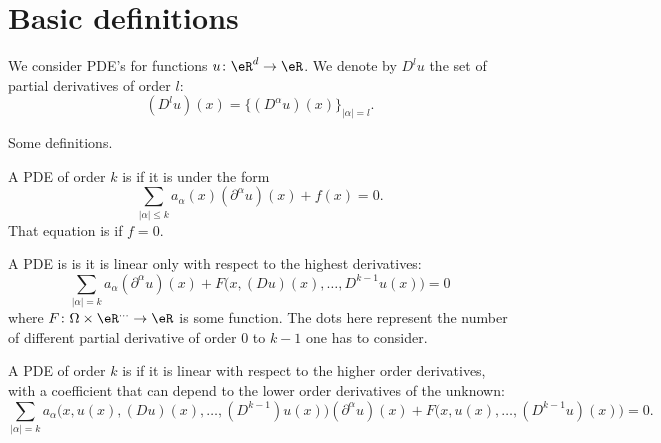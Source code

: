 
\section{Basic definitions}

We consider PDE's for functions \( u\colon \eR^d\to \eR\). We denote by \( D^lu\) the set of partial derivatives of order \( l\):
\begin{equation}
    (D^lu)(x)=\{ (D^{\alpha}u)(x) \}_{| \alpha |=l}.
\end{equation}

Some definitions.
\begin{definition}
    A PDE of order \( k\) is  if it is under the form
    \begin{equation}
        \sum_{| \alpha |\leq k}a_{\alpha}(x)(\partial^{\alpha}u)(x)+f(x)=0.
    \end{equation}
    That equation is  if \( f=0\).
\end{definition}

\begin{definition}
    A PDE is  is it is linear only with respect to the highest derivatives:
    \begin{equation}
        \sum_{| \alpha |=k}a_{\alpha}(\partial^{\alpha}u)(x)+F\big( x, (Du)(x),\ldots, D^{k-1}u(x) \big)=0
    \end{equation}
    where \( F\colon \Omega\times \eR^{\ldots}\to \eR\) is some function. The dots here represent the number of different partial derivative of order \( 0\) to \( k-1\) one has to consider.
\end{definition}

\begin{definition}
    A PDE of order \( k\) is  if it is linear with respect to the higher order derivatives, with a coefficient that can depend to the lower order derivatives of the unknown:
    \begin{equation}
        \sum_{| \alpha |=k}a_{\alpha}\big( x,u(x),(Du)(x),\ldots, (D^{k-1})u(x) \big)(\partial^{\alpha}u)(x)+F\big( x,u(x),\ldots, (D^{k-1}u)(x) \big)=0.
    \end{equation}
\end{definition}

